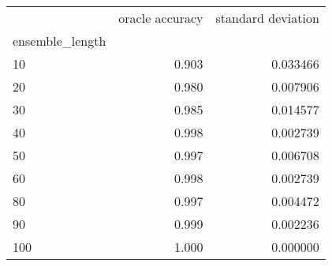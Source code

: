 \begin{tabular}{lrr}
\toprule
{} &  oracle accuracy &  standard deviation \\
ensemble\_length &                  &                     \\
\midrule
10              &            0.903 &            0.033466 \\
20              &            0.980 &            0.007906 \\
30              &            0.985 &            0.014577 \\
40              &            0.998 &            0.002739 \\
50              &            0.997 &            0.006708 \\
60              &            0.998 &            0.002739 \\
80              &            0.997 &            0.004472 \\
90              &            0.999 &            0.002236 \\
100             &            1.000 &            0.000000 \\
\bottomrule
\end{tabular}
